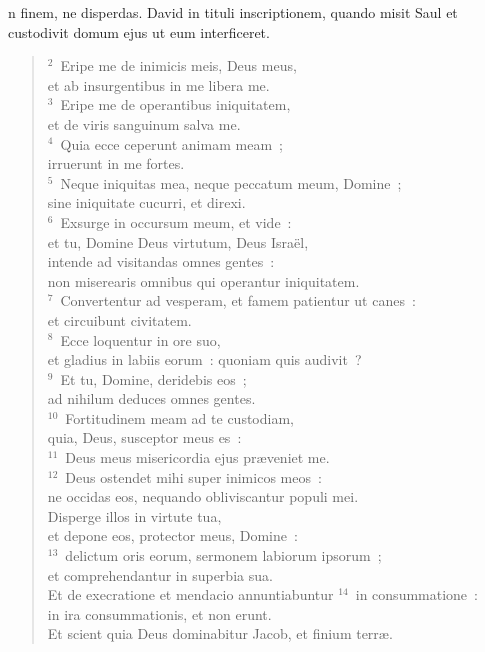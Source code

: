 \bchapter[Psalm]
n finem, ne disperdas. David in tituli inscriptionem, quando misit Saul et custodivit domum ejus ut eum interficeret.
\begin{verse}${}^{2}$~Eripe me de inimicis meis, Deus meus,\\ et ab insurgentibus in me libera me.\\
${}^{3}$~Eripe me de operantibus iniquitatem,\\ et de viris sanguinum salva me.\\
${}^{4}$~Quia ecce ceperunt animam meam~;\\ irruerunt in me fortes.\\
${}^{5}$~Neque iniquitas mea, neque peccatum meum, Domine~;\\ sine iniquitate cucurri, et direxi.\\
${}^{6}$~Exsurge in occursum meum, et vide~:\\ et tu, Domine Deus virtutum, Deus Isra\"el,\\ intende ad visitandas omnes gentes~:\\ non miserearis omnibus qui operantur iniquitatem.\\
${}^{7}$~Convertentur ad vesperam, et famem patientur ut canes~:\\ et circuibunt civitatem.\\
${}^{8}$~Ecce loquentur in ore suo,\\ et gladius in labiis eorum~: quoniam quis audivit~?\\
${}^{9}$~Et tu, Domine, deridebis eos~;\\ ad nihilum deduces omnes gentes.\\
${}^{10}$~Fortitudinem meam ad te custodiam,\\ quia, Deus, susceptor meus es~:\\
${}^{11}$~Deus meus misericordia ejus pr\ae veniet me.\\
${}^{12}$~Deus ostendet mihi super inimicos meos~:\\ ne occidas eos, nequando obliviscantur populi mei.\\ Disperge illos in virtute tua,\\ et depone eos, protector meus, Domine~:\\
${}^{13}$~delictum oris eorum, sermonem labiorum ipsorum~;\\ et comprehendantur in superbia sua.\\ Et de execratione et mendacio annuntiabuntur
${}^{14}$~in consummatione~:\\ in ira consummationis, et non erunt.\\ Et scient quia Deus dominabitur Jacob, et finium terr\ae .\\

\end{verse}
